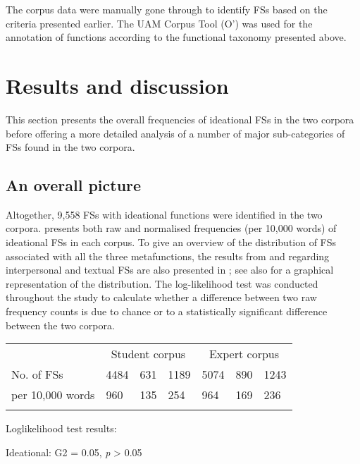 \documentclass[output=paper]{langsci/langscibook}
\begin{document}
The corpus data were manually gone through to identify FSs based on the criteria presented earlier. The UAM Corpus Tool (O’\citealt{Donnell2013}) was used for the annotation of functions according to the functional taxonomy presented above.

\section{Results and discussion}

This section presents the overall frequencies of ideational FSs in the two corpora before offering a more detailed analysis of a number of major sub-categories of FSs found in the two corpora.

\subsection{An overall picture}

Altogether, 9,558 FSs with ideational functions were identified in the two corpora.  presents both raw and normalised frequencies (per 10,000 words) of ideational FSs in each corpus. To give an overview of the distribution of FSs associated with all the three metafunctions, the results from \citet{Wang2018} and  regarding interpersonal and textual FSs are also presented in ; see also  for a graphical representation of the distribution. The log-likelihood test was conducted throughout the study to calculate whether a difference between two raw frequency counts is due to chance or to a statistically significant difference between the two corpora. 


\begin{tabularx}{\textwidth}{XXXXXXX} & \multicolumn{3}{c}{ Student corpus} & \multicolumn{3}{c}{ Expert corpus}\\

\lsptoprule
No. of FSs & 4484 & 631 & 1189 & 5074 & 890 & 1243\\
per 10,000 words & 960 & 135 & 254 & 964 & 169 & 236\\
\lspbottomrule
\end{tabularx}
Loglikelihood test results:

Ideational: G2 = 0.05, \textit{p} > 0.05
\end{document}
